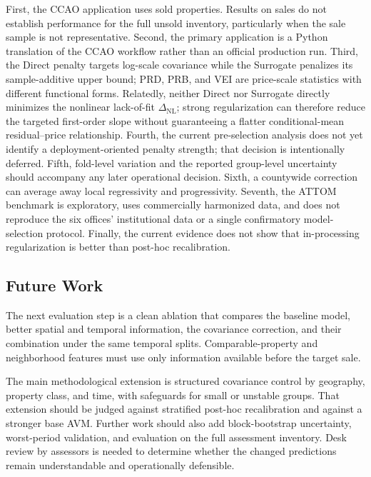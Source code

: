 \documentclass[10pt]{article}
\theoremstyle{definition}
\newcommand{\1}{\mathbf{1}}
\newcommand{\advisorchange}[1]{{\color{blue}#1}}
\newcommand{\oldtext}[1]{\textcolor{blue}{\sout{#1}}}
\newcommand{\newtext}[1]{\textcolor{impGreen}{#1}}
\begin{document}
\advisorchange{First, the CCAO application uses sold properties.} Results on sales do not establish performance for the full unsold inventory, particularly when the sale sample is not representative. \advisorchange{Second, the primary application is a Python translation} of the CCAO workflow rather than an official production run. 
\newtext{Third, the Direct penalty targets log-scale covariance while the Surrogate penalizes its sample-additive upper bound; PRD, PRB, and VEI are price-scale statistics with different functional forms.} \newtext{Relatedly, neither Direct nor Surrogate directly minimizes the nonlinear lack-of-fit $\Delta_{\mathrm{NL}}$; strong regularization can therefore reduce the targeted first-order slope without guaranteeing a flatter conditional-mean residual--price relationship.} Fourth, the current pre-selection analysis does not yet identify a deployment-oriented penalty strength; that decision is intentionally deferred. Fifth, fold-level variation and the reported group-level uncertainty should accompany any later operational decision. Sixth, a countywide correction can average away local regressivity and progressivity. Seventh, the ATTOM benchmark is exploratory, uses commercially harmonized data, and does not reproduce the six offices' institutional data or a single confirmatory model-selection protocol. Finally, the current evidence does not show that in-processing regularization is better than post-hoc recalibration.

\subsection{Future Work}

\advisorchange{The next evaluation step is a clean ablation} that compares the baseline model, better spatial and temporal information, the covariance correction, and their combination under the same temporal splits. Comparable-property and neighborhood features must use only information available before the target sale. 

The main methodological extension is structured covariance control by geography, property class, and time, with safeguards for small or unstable groups. That extension should be judged against stratified post-hoc recalibration and against a stronger base AVM. Further work should also add block-bootstrap uncertainty, worst-period validation, and evaluation on the full assessment inventory. Desk review by assessors is needed to determine whether the changed predictions remain understandable and operationally defensible.
\end{document}
